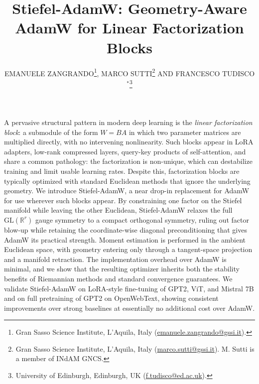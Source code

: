 \documentclass[11pt,a4paper]{article}
\numberwithin{equation}{section}
\renewenvironment{abstract}
 {\small
  \begin{center}
  \bfseries \abstractname\vspace{-.5em}\vspace{0pt}
  \end{center}
  \list{}{
    \setlength{\leftmargin}{0.0cm}%
    \setlength{\rightmargin}{\leftmargin}%
  }%
  \item\relax}
 {\endlist}
\newcommand{\email}[1]{\protect\href{mailto:#1}{#1}}
\newcommand{\algname}{Stiefel-AdamW}
\newcommand{\R}{\mathbb{R}}
\theoremstyle{plain}
\theoremstyle{definition}
\theoremstyle{remark}
\begin{document}
\title{\algname: Geometry-Aware AdamW for Linear Factorization Blocks}

\author{\MakeUppercase{Emanuele Zangrando}\thanks{Gran Sasso Science Institute, L'Aquila, Italy (\email{emanuele.zangrando@gssi.it}).}\hspace{2mm}, \MakeUppercase{Marco Sutti}\thanks{Gran Sasso Science Institute, L'Aquila, Italy (\email{marco.sutti@gssi.it}). M. Sutti is a member of INdAM GNCS.}\hspace{2mm} \MakeUppercase{and Francesco Tudisco$^*$}\thanks{University of Edinburgh, Edinburgh, UK (\email{f.tudisco@ed.ac.uk}).}\hspace{2mm}\orcidlink{}}


\maketitle

\begin{abstract}
A pervasive structural pattern in modern deep learning is the \emph{linear factorization block}: a submodule of the form $W = BA$ in which two parameter matrices are multiplied directly, with no intervening nonlinearity. Such blocks appear in LoRA adapters, low-rank compressed layers, query-key products of self-attention, and share a common pathology: the factorization is non-unique, which can destabilize training and limit usable learning rates. Despite this, factorization blocks are typically optimized with standard Euclidean methods that ignore the underlying geometry.
We introduce \algname{}, a near drop-in replacement for AdamW for use wherever such blocks appear. By constraining one factor on the Stiefel manifold while leaving the other Euclidean, \algname{} relaxes the full $\mathrm{GL}(\R^r)$ gauge symmetry to a compact orthogonal symmetry, ruling out factor blow-up while retaining the coordinate-wise diagonal preconditioning that gives AdamW its practical strength. Moment estimation is performed in the ambient Euclidean space, with geometry entering only through a tangent-space projection and a manifold retraction. The implementation overhead over AdamW is minimal, and we show that the resulting optimizer inherits both the stability benefits of Riemannian methods and standard convergence guarantees. We validate \algname{} on LoRA-style fine-tuning of GPT2, ViT, and Mistral 7B and on full pretraining of GPT2 on OpenWebText, showing consistent improvements over strong baselines at essentially no additional cost over AdamW.
\end{abstract}
\end{document}
